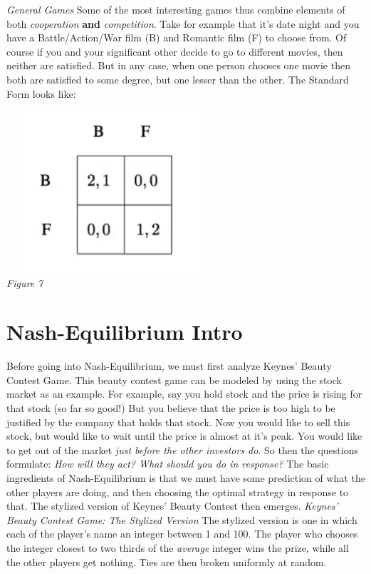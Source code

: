 \documentclass{article}
\begin{document}
\vskip 0.1in
\emph{General Games}
\vskip 0.1in
Some of the most interesting games thus combine elements of both \emph{cooperation} \textbf{and} \emph{competition}. Take for example that it's date night and you have a Battle/Action/War film (B) and Romantic film (F) to choose from. Of course if you and your significant other decide to go to different movies, then neither are satisfied. But in any case, when one person chooses one movie then both are satisfied to some degree, but one lesser than the other. The Standard Form looks like:
\begin{center}
    \includegraphics[width = 8cm, height = 6cm]{IMG_007.png} \\
    \emph{Figure 7}
\end{center}

\section{Nash-Equilibrium Intro}

Before going into Nash-Equilibrium, we must first analyze Keynes' Beauty Contest Game. This beauty contest game can be modeled by using the stock market as an example. For example, say you hold stock and the price is rising for that stock (so far so good!) But you believe that the price is too high to be justified by the company that holds that stock. Now you would like to sell this stock, but would like to wait until the price is almost at it's peak. You would like to get out of the market \emph{just before the other investors do}. So then the questions formulate: \emph{How will they act? What should you do in response?}
\vskip 0.1in
The basic ingredients of Nash-Equilibrium is that we must have some prediction of what the other players are doing, and then choosing the optimal strategy in response to that. The stylized version of Keynes' Beauty Contest then emerges. 
\vskip 0.1in
\emph{Keynes' Beauty Contest Game: The Stylized Version}
\vskip 0.1in
The stylized version is one in which each of the player's name an integer between 1 and 100. The player who chooses the integer closest to two thirds of the \emph{average} integer wins the prize, while all the other players get nothing. Ties are then broken uniformly at random.
\end{document}
